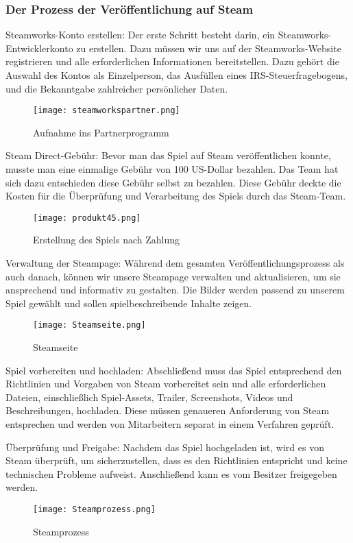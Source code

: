 \subsubsection{Der Prozess der Veröffentlichung auf Steam}\label{subsubsec:Veröffentlichungsprozess}

Steamworks-Konto erstellen: Der erste Schritt besteht darin, ein Steamworks-Entwicklerkonto zu erstellen. Dazu müssen wir uns auf der Steamworks-Website registrieren und alle erforderlichen Informationen bereitstellen. Dazu gehört die Auswahl des Kontos als Einzelperson, das Ausfüllen eines IRS-Steuerfragebogens, und die Bekanntgabe zahlreicher persönlicher Daten.
\begin{figure}[H]
    \texttt{[image: steamworkspartner.png]}
    \caption{Aufnahme ins Partnerprogramm}
\end{figure}

Steam Direct-Gebühr: Bevor man das Spiel auf Steam veröffentlichen konnte, musste man eine einmalige Gebühr von 100 US-Dollar bezahlen. Das Team hat sich dazu entschieden diese Gebühr selbst zu bezahlen. Diese Gebühr deckte die Kosten für die Überprüfung und Verarbeitung des Spiels durch das Steam-Team.
\begin{figure}[H]
    \texttt{[image: produkt45.png]}
    \caption{Erstellung des Spiels nach Zahlung}
\end{figure}

Verwaltung der Steampage: Während dem gesamten Veröffentlichungsprozess als auch danach, können wir unsere Steampage verwalten und aktualisieren, um sie ansprechend und informativ zu gestalten. Die Bilder werden passend zu unserem Spiel gewählt und sollen spielbeschreibende Inhalte zeigen.
\begin{figure}[H]
    \texttt{[image: Steamseite.png]}
    \caption{Steamseite}
\end{figure}

Spiel vorbereiten und hochladen: Abschließend muss das Spiel entsprechend den Richtlinien und Vorgaben von Steam vorbereitet sein und alle erforderlichen Dateien, einschließlich Spiel-Assets, Trailer, Screenshots, Videos und Beschreibungen, hochladen. Diese müssen genaueren Anforderung von Steam entsprechen und werden von Mitarbeitern separat in einem Verfahren geprüft.

Überprüfung und Freigabe: Nachdem das Spiel hochgeladen ist, wird es von Steam überprüft, um sicherzustellen, dass es den Richtlinien entspricht und keine technischen Probleme aufweist. Anschließend kann es vom Besitzer freigegeben werden.
\begin{figure}[H]
    \texttt{[image: Steamprozess.png]}
    \caption{Steamprozess}
\end{figure}

